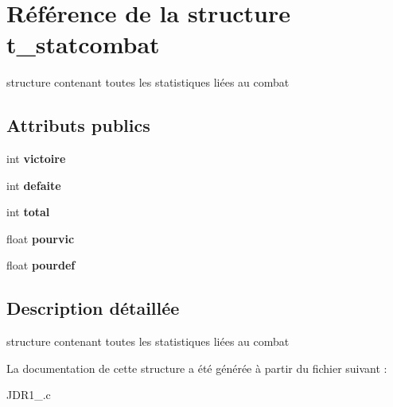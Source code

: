 \hypertarget{structt__statcombat}{\section{Référence de la structure t\-\_\-statcombat}
\label{structt__statcombat}
}


structure contenant toutes les statistiques liées au combat  


\subsection*{Attributs publics}
\begin{DoxyCompactItemize}
\item 
\hypertarget{structt__statcombat_a4edfc4a7c87639782addb649d1aa43b3}{int {\bfseries victoire}}\label{structt__statcombat_a4edfc4a7c87639782addb649d1aa43b3}

\item 
\hypertarget{structt__statcombat_a421582b83575c718ca753aa3ed00c8bb}{int {\bfseries defaite}}\label{structt__statcombat_a421582b83575c718ca753aa3ed00c8bb}

\item 
\hypertarget{structt__statcombat_a118c899f6ffd51093d8742a3e35ac3db}{int {\bfseries total}}\label{structt__statcombat_a118c899f6ffd51093d8742a3e35ac3db}

\item 
\hypertarget{structt__statcombat_a5542c3edd67cd27fed17f5e7d6d53f06}{float {\bfseries pourvic}}\label{structt__statcombat_a5542c3edd67cd27fed17f5e7d6d53f06}

\item 
\hypertarget{structt__statcombat_aa31e993cc641c954c9b8072829d94d43}{float {\bfseries pourdef}}\label{structt__statcombat_aa31e993cc641c954c9b8072829d94d43}

\end{DoxyCompactItemize}


\subsection{Description détaillée}
structure contenant toutes les statistiques liées au combat 

La documentation de cette structure a été générée à partir du fichier suivant \-:\begin{DoxyCompactItemize}
\item 
J\-D\-R1\-\_.\-c\end{DoxyCompactItemize}
